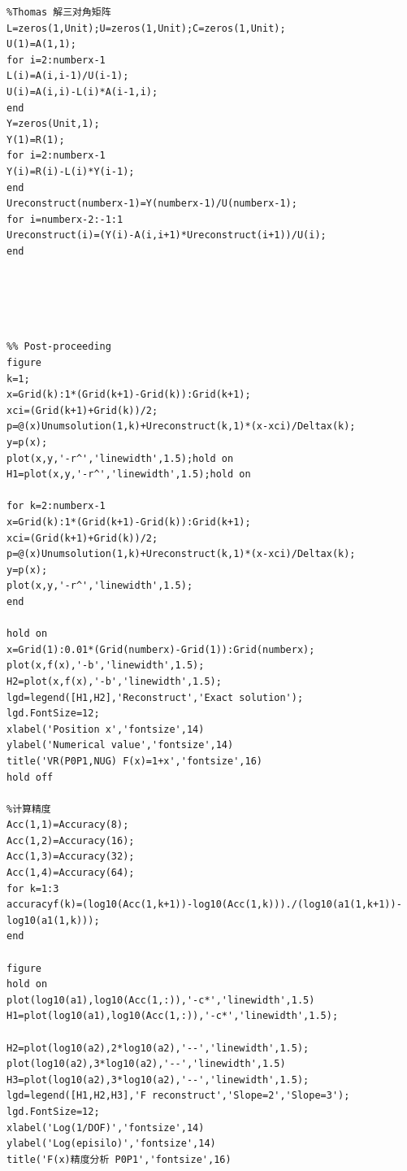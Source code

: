 \documentclass[a4paper,11pt,UTF8]{article}%
\theoremstyle{plain}
\begin{document}
\begin{lstlisting}
%Thomas 解三对角矩阵
L=zeros(1,Unit);U=zeros(1,Unit);C=zeros(1,Unit);
U(1)=A(1,1);
for i=2:numberx-1
L(i)=A(i,i-1)/U(i-1);
U(i)=A(i,i)-L(i)*A(i-1,i);
end
Y=zeros(Unit,1);
Y(1)=R(1);
for i=2:numberx-1
Y(i)=R(i)-L(i)*Y(i-1);
end
Ureconstruct(numberx-1)=Y(numberx-1)/U(numberx-1);
for i=numberx-2:-1:1
Ureconstruct(i)=(Y(i)-A(i,i+1)*Ureconstruct(i+1))/U(i);
end





%% Post-proceeding
figure
k=1;
x=Grid(k):1*(Grid(k+1)-Grid(k)):Grid(k+1);
xci=(Grid(k+1)+Grid(k))/2;
p=@(x)Unumsolution(1,k)+Ureconstruct(k,1)*(x-xci)/Deltax(k);
y=p(x);
plot(x,y,'-r^','linewidth',1.5);hold on
H1=plot(x,y,'-r^','linewidth',1.5);hold on

for k=2:numberx-1
x=Grid(k):1*(Grid(k+1)-Grid(k)):Grid(k+1);
xci=(Grid(k+1)+Grid(k))/2;
p=@(x)Unumsolution(1,k)+Ureconstruct(k,1)*(x-xci)/Deltax(k);
y=p(x);
plot(x,y,'-r^','linewidth',1.5);
end

hold on
x=Grid(1):0.01*(Grid(numberx)-Grid(1)):Grid(numberx);
plot(x,f(x),'-b','linewidth',1.5);
H2=plot(x,f(x),'-b','linewidth',1.5);
lgd=legend([H1,H2],'Reconstruct','Exact solution');
lgd.FontSize=12;
xlabel('Position x','fontsize',14)
ylabel('Numerical value','fontsize',14)
title('VR(P0P1,NUG) F(x)=1+x','fontsize',16)
hold off

%计算精度
Acc(1,1)=Accuracy(8);
Acc(1,2)=Accuracy(16);
Acc(1,3)=Accuracy(32);
Acc(1,4)=Accuracy(64);
for k=1:3
accuracyf(k)=(log10(Acc(1,k+1))-log10(Acc(1,k)))./(log10(a1(1,k+1))-log10(a1(1,k)));
end

figure
hold on
plot(log10(a1),log10(Acc(1,:)),'-c*','linewidth',1.5)
H1=plot(log10(a1),log10(Acc(1,:)),'-c*','linewidth',1.5);

H2=plot(log10(a2),2*log10(a2),'--','linewidth',1.5);
plot(log10(a2),3*log10(a2),'--','linewidth',1.5)
H3=plot(log10(a2),3*log10(a2),'--','linewidth',1.5);
lgd=legend([H1,H2,H3],'F reconstruct','Slope=2','Slope=3');
lgd.FontSize=12;
xlabel('Log(1/DOF)','fontsize',14)
ylabel('Log(episilo)','fontsize',14)
title('F(x)精度分析 P0P1','fontsize',16)
	
\end{lstlisting}

	
\end{document}
